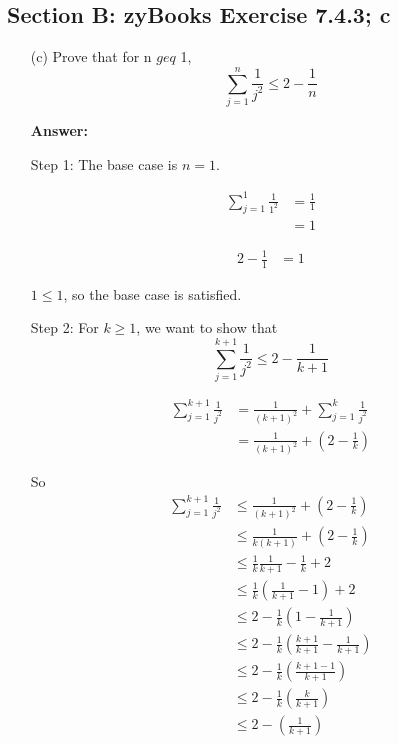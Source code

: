 \documentclass[14pt]{extreport}
\newcommand{\answer}[0]{\medskip \textbf{Answer:} \medskip}
\begin{document}
\subsection*{Section B: zyBooks Exercise 7.4.3; c}

\begin{enumerate}
    
    \item[(c)] Prove that for n \( geq \) 1, 
    \[
        \sum_{j=1}^n \frac{1}{j^2} \leq 2 - \frac{1}{n}
    \]

        \answer

        Step 1: The base case is \( n = 1 \). 
        
        \begin{align*}
            \sum_{j=1}^1 \frac{1}{1^2} &= \frac{1}{1} \\
                                       &= 1
        \end{align*}

        \begin{align*}
            2 - \frac{1}{1} &= 1
        \end{align*}

        \( 1 \leq 1 \), so the base case is satisfied.

        \medskip

        Step 2: For \( k \geq 1 \), we want to show that 
        \[
            \sum_{j=1}^{k+1} \frac{1}{j^2} \leq 2 - \frac{1}{k + 1}
        \]

        \begin{align*}
            \sum_{j=1}^{k+1} \frac{1}{j^2} &= \frac{1}{(k + 1)^2} + \sum_{j=1}^{k} \frac{1}{j^2} \\
                                           &= \frac{1}{(k + 1)^2} + \left( 2 - \frac{1}{k} \right)
        \end{align*}
        
        So
        \begin{align*}
            \sum_{j=1}^{k+1} \frac{1}{j^2} &\leq \frac{1}{(k + 1)^2} + \left( 2 - \frac{1}{k} \right) \\
                &\leq \frac{1}{k(k + 1)} + \left( 2 - \frac{1}{k} \right) \\
                &\leq \frac{1}{k} \frac{1}{k + 1} - \frac{1}{k} + 2 \\
                &\leq \frac{1}{k} \left( \frac{1}{k + 1} - 1 \right) + 2 \\
                &\leq 2 - \frac{1}{k} \left( 1 - \frac{1}{k + 1} \right) \\
                &\leq 2 - \frac{1}{k} \left( \frac{k + 1}{k + 1} - \frac{1}{k + 1} \right) \\
                &\leq 2 - \frac{1}{k} \left( \frac{k + 1 - 1}{k + 1} \right) \\
                &\leq 2 - \frac{1}{k} \left( \frac{k}{k + 1} \right) \\
                &\leq 2 - \left( \frac{1}{k + 1} \right) \\
        \end{align*}


\end{enumerate}
\end{document}
